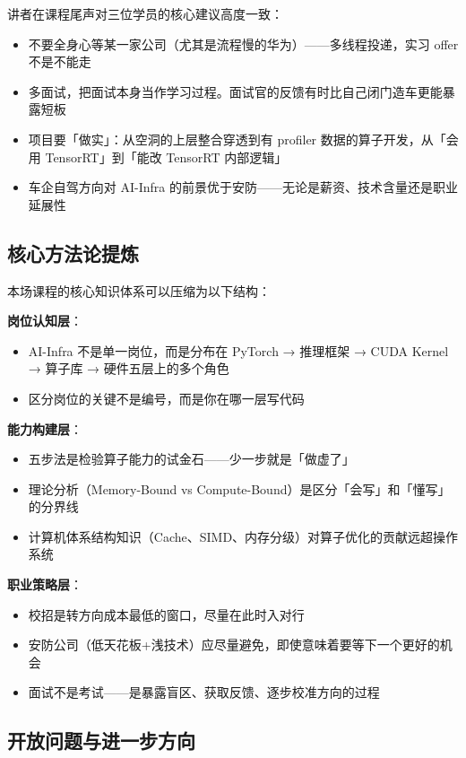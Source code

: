\documentclass[a4paper]{article}
\begin{document}
讲者在课程尾声对三位学员的核心建议高度一致：

\begin{itemize}
    \item 不要全身心等某一家公司（尤其是流程慢的华为）——多线程投递，实习 offer 不是不能走
    \item 多面试，把面试本身当作学习过程。面试官的反馈有时比自己闭门造车更能暴露短板
    \item 项目要「做实」：从空洞的上层整合穿透到有 profiler 数据的算子开发，从「会用 TensorRT」到「能改 TensorRT 内部逻辑」
    \item 车企自驾方向对 AI-Infra 的前景优于安防——无论是薪资、技术含量还是职业延展性
\end{itemize}

\subsection{核心方法论提炼}

本场课程的核心知识体系可以压缩为以下结构：

\textbf{岗位认知层}：
\begin{itemize}
    \item AI-Infra 不是单一岗位，而是分布在 PyTorch → 推理框架 → CUDA Kernel → 算子库 → 硬件五层上的多个角色
    \item 区分岗位的关键不是编号，而是你在哪一层写代码
\end{itemize}

\textbf{能力构建层}：
\begin{itemize}
    \item 五步法是检验算子能力的试金石——少一步就是「做虚了」
    \item 理论分析（Memory-Bound vs Compute-Bound）是区分「会写」和「懂写」的分界线
    \item 计算机体系结构知识（Cache、SIMD、内存分级）对算子优化的贡献远超操作系统
\end{itemize}

\textbf{职业策略层}：
\begin{itemize}
    \item 校招是转方向成本最低的窗口，尽量在此时入对行
    \item 安防公司（低天花板+浅技术）应尽量避免，即使意味着要等下一个更好的机会
    \item 面试不是考试——是暴露盲区、获取反馈、逐步校准方向的过程
\end{itemize}

\subsection{开放问题与进一步方向}
\end{document}
